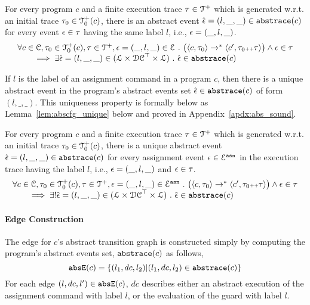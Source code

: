 \begin{lem}
\label{lem:abscfg_sound}
For every program $c$ and
a finite execution trace $\mathtt{\tau} \in \mathcal{T}^{+}$ which is generated w.r.t.
an initial trace  $\mathtt{\tau}_0 \in \mathcal{T}^{+}_0(c)$,
there is an abstract event $\hat{\mathtt{\epsilon}{}} = (l, \_, \_) \in \mathtt{abs}{\mathtt{trace}}(c)$ 
for every event $\mathtt{\epsilon} \in \mathtt{\tau}$ having the same label $l$, i.e., $\mathtt{\epsilon} = (\_, l, \_)$.
%
\[
\begin{array}{l}
  \forall c \in \mathcal{C}, \mathtt{\tau}_0 \in \mathcal{T}^{+}_0(c), \mathtt{\tau} \in \mathcal{T}^{+} ,  \mathtt{\epsilon} = (\_, l, \_) \in \mathcal{E} ~.~
  \big(
    \langle {c}, \mathtt{\tau}_0 \rangle \to^{*} \langle c', \mathtt{\tau}_0 {\scriptscriptstyle ++} \mathtt{\tau} \rangle 
  \big)
  \land \mathtt{\epsilon} \in \mathtt{\tau} 
  \\
  \qquad \implies \exists \hat{\mathtt{\epsilon}{}} = (l, \_, \_) \in (\mathcal{L}\times \mathcal{DC}^{\top} \times \mathcal{L}) ~.~ 
  \hat{\mathtt{\epsilon}{}} \in \mathtt{abs}{\mathtt{trace}}(c)
\end{array}
\]
\end{lem}
If $l$ is the label of an assignment command in a program $c$,
then there is a unique abstract event in the program's abstract events set
$\hat{\mathtt{\epsilon}{}} \in \mathtt{abs}{\mathtt{trace}}(c)$ of form $(l, \_, \_)$. This uniqueness property is formally below as Lemma~\ref{lem:abscfg_unique} below
and proved in Appendix~\ref{apdx:abs_sound}.
\begin{lem}
\label{lem:abscfg_unique}
For every program $c$ and
a finite execution trace $\mathtt{\tau} \in \mathcal{T}^{+}$ which is generated w.r.t.
an initial trace $\mathtt{\tau}_0 \in \mathcal{T}^{+}_0(c)$,
there is a unique abstract event $\hat{\mathtt{\epsilon}{}} = (l, \_, \_) \in \mathtt{abs}{\mathtt{trace}}(c)$ 
for every assignment event $\mathtt{\epsilon} \in \mathcal{E}^{\mathtt{{asn}}}$ in the
execution trace having the label $l$, i.e., $\mathtt{\epsilon} = (\_, l, \_)$ and $\mathtt{\epsilon} \in \mathtt{\tau}$.
%
\[
  \begin{array}{l}
  \forall c \in \mathcal{C}, \mathtt{\tau}_0 \in \mathcal{T}^{+}_0(c), \mathtt{\tau} \in \mathcal{T}^{+} ,  \mathtt{\epsilon} = (\_, l, \_) \in \mathcal{E}^{\mathtt{{asn}}} ~.~
  \big(
    \langle {c}, \mathtt{\tau}_0 \rangle \to^{*} \langle c', \mathtt{\tau}_0 {\scriptscriptstyle ++} \mathtt{\tau} \rangle 
  \big)
  \land \mathtt{\epsilon} \in \mathtt{\tau} 
  \\
  \qquad \implies \exists ! \hat{\mathtt{\epsilon}{}} = (l, \_, \_) \in (\mathcal{L}\times \mathcal{DC}^{\top} \times \mathcal{L}) ~.~ 
  \hat{\mathtt{\epsilon}{}} \in \mathtt{abs}{\mathtt{trace}}(c)
  \end{array}
\]
\end{lem}
%
\paragraph{Edge Construction}
The edge for $c$'s abstract transition graph is constructed simply by computing the program's abstract events set, $\mathtt{abs}{\mathtt{trace}}(c)$ as follows,
  \[
    \mathtt{abs}{\mathtt{E}}(c) = \{(l_1, dc, l_2) | (l_1, dc, l_2) \in \mathtt{abs}{\mathtt{trace}}(c)\}
  \]
For each edge $(l, dc, l') \in \mathtt{abs}{\mathtt{E}}(c)$, $dc$ describes either an abstract execution of the assignment command with label $l$,
or the evaluation of the guard with label $l$.
%
